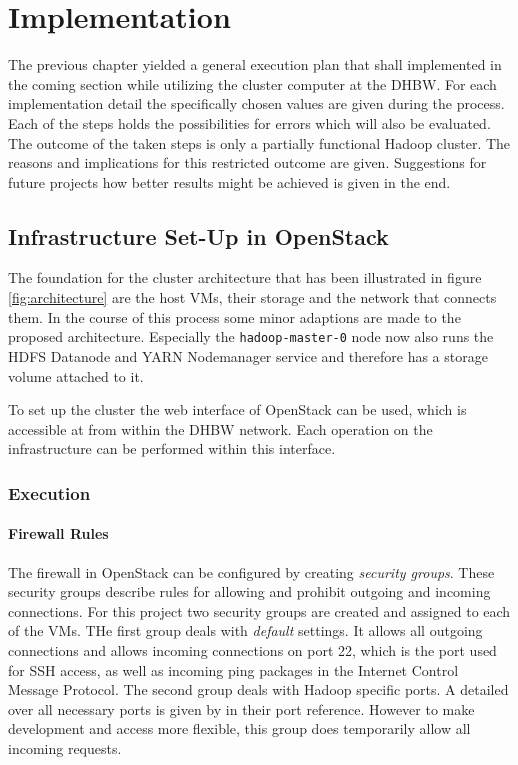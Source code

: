 \chapter{Implementation}
\label{chap:impl}

The previous chapter yielded a general execution plan that shall implemented in the coming 
section while utilizing the cluster computer at the \ac{DHBW}. 
For each implementation detail the specifically chosen values are given during the process. Each of the steps holds 
the possibilities for errors which will also be evaluated.
The outcome of the taken steps is only a partially functional Hadoop cluster.
The reasons and implications for this restricted outcome are given.
Suggestions for future projects how better results might be achieved is given in the end.

\section{Infrastructure Set-Up in OpenStack}

The foundation for the cluster architecture that has been illustrated in figure \vref{fig:architecture} are the host \acp{VM}, their storage and the network that connects them.
In the course of this process some minor adaptions are made to the proposed architecture.
Especially the \texttt{hadoop-master-0} node now also runs the \ac{HDFS} Datanode and YARN Nodemanager service and therefore has a storage volume attached to it.

To set up the cluster the web interface of OpenStack can be used, which is accessible at
 from within the \ac{DHBW} network.
Each operation on the infrastructure can be performed within this interface.

\subsection{Execution}

\subsubsection{Firewall Rules}

The firewall in OpenStack can be configured by creating \emph{security groups}.
These security groups describe rules for allowing and prohibit outgoing and incoming connections.
For this project two security groups are created and assigned to each of the \acp{VM}.
THe first group deals with \emph{default} settings. It allows all outgoing connections 
and allows incoming connections on port 22, which is the port used for \ac{SSH} access, 
as well as incoming ping packages in the Internet Control Message Protocol.
The second group deals with Hadoop specific ports.
A detailed over all necessary ports is given by \textcite{hortonworks2017reference} in their port reference.
However to make development and access more flexible, this group does temporarily 
allow all incoming requests.

